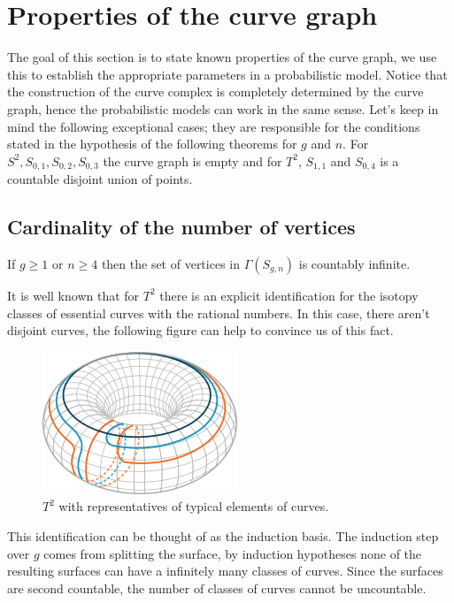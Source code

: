 \section{Properties of the curve graph}
The goal of this section is to state known properties of the curve graph, we use this to establish the appropriate parameters in a probabilistic model. Notice that the construction of the curve complex is completely determined by the curve graph, hence the probabilistic models can work in the same sense. Let's keep in mind the following exceptional cases; they are responsible for the conditions stated in the hypothesis of the following theorems for $g$ and $n$. For $ S^2, S_{0,1}, S _{0,2}, S_{0,3} $ the curve graph is empty and for  $ T^{2} $, $ S_{1,1}$ and $ S_{0,4}$ is a countable disjoint union of points.

\subsection{Cardinality of the number of vertices}
\begin{theorem}
If $g\geq 1$ or $n\geq 4$ then the set of vertices in $\Gamma(S_{g,n})$ is countably infinite.
\end{theorem}

It is well known that for $T^{2}$ there is an explicit identification for the isotopy classes of essential curves with the rational numbers. In this case, there aren't disjoint curves, the following figure can help to convince us of this fact.
\vspace{0.5cm}
\begin{figure}[h!]
	\centering
	\includegraphics[scale=1]{Figures/Torus.png}
	\caption{$T^{2}$ with representatives of typical elements of curves.}
\end{figure}

This identification can be thought of as the induction basis. The induction step over $g$ comes from splitting the surface, by induction hypotheses none of the resulting surfaces can have a infinitely many classes of curves. Since the surfaces are second countable, the number of classes of curves cannot be uncountable.


